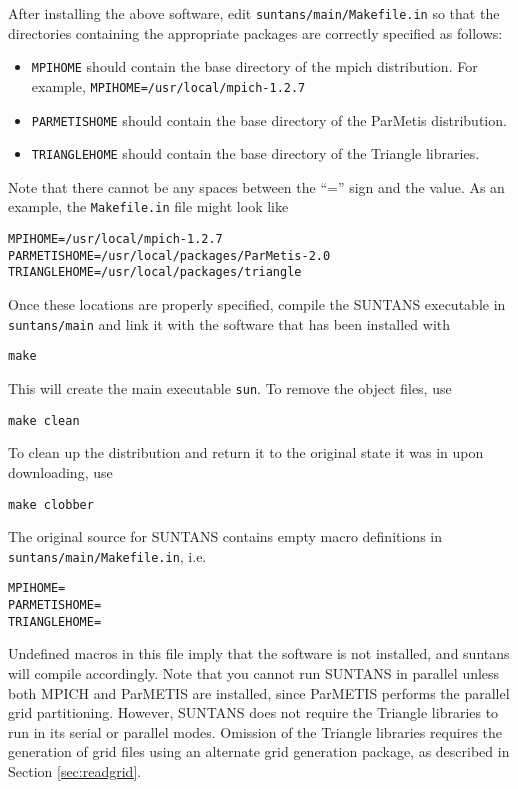 After installing the above software, edit \verb+suntans/main/Makefile.in+ 
so that the directories containing the appropriate packages
are correctly specified as follows:
\begin{itemize}
\item \verb+MPIHOME+ should contain the base directory of the mpich distribution.
For example, 
\verb+MPIHOME=/usr/local/mpich-1.2.7+
\item \verb+PARMETISHOME+ should contain the base directory of the ParMetis distribution.
\item \verb+TRIANGLEHOME+ should contain the base directory of the Triangle libraries.
\end{itemize}
Note that there cannot be any spaces between the ``='' sign and the value.  As an example,
the \verb+Makefile.in+ file might look like
\begin{verbatim}
MPIHOME=/usr/local/mpich-1.2.7
PARMETISHOME=/usr/local/packages/ParMetis-2.0
TRIANGLEHOME=/usr/local/packages/triangle
\end{verbatim}
Once these locations are properly specified, compile the SUNTANS executable in \verb+suntans/main+ and
link it with the software that has been installed with
\begin{verbatim}
make
\end{verbatim}
This will create the main executable \verb+sun+.  
To remove the object files, use
\begin{verbatim}
make clean
\end{verbatim}
To clean up the distribution and return it to the original state it was in upon downloading,
use
\begin{verbatim}
make clobber
\end{verbatim}

The original source for SUNTANS contains empty macro definitions in \\
\verb+suntans/main/Makefile.in+, i.e.
\begin{verbatim}
MPIHOME=
PARMETISHOME=
TRIANGLEHOME=
\end{verbatim}
Undefined macros in this file imply that the software is not installed, and suntans will compile
accordingly.  Note that you cannot run SUNTANS in parallel unless both MPICH and ParMETIS are
installed, since ParMETIS performs the parallel grid partitioning.  However, SUNTANS does not
require the Triangle libraries to run in its serial or parallel modes.  Omission of the Triangle 
libraries requires the generation of grid files using an alternate grid generation package, 
as described in Section  \ref{sec:readgrid}.

